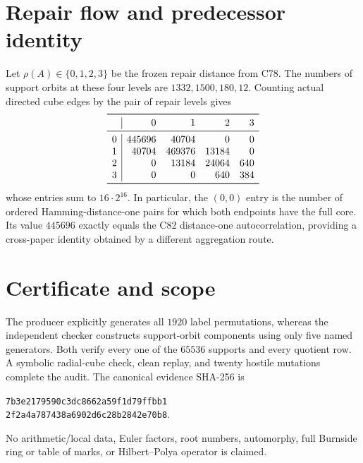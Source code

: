 \documentclass[10pt]{article}
\begin{document}
\section{Repair flow and predecessor identity}
Let $\rho(A)\in\{0,1,2,3\}$ be the frozen repair distance from C78.  The
numbers of support orbits at these four levels are $1332,1500,180,12$.
Counting actual directed cube edges by the pair of repair levels gives
\[
\begin{array}{c|rrrr}
\toprule
&0&1&2&3\\\midrule
0&445696&40704&0&0\\
1&40704&469376&13184&0\\
2&0&13184&24064&640\\
3&0&0&640&384\\
\bottomrule
\end{array}
\]
whose entries sum to $16\cdot2^{16}$.  In particular, the $(0,0)$ entry is
the number of ordered Hamming-distance-one pairs for which both endpoints
have the full core.  Its value $445696$ exactly equals the C82
distance-one autocorrelation, providing a cross-paper identity obtained by
a different aggregation route.

\section{Certificate and scope}
The producer explicitly generates all $1920$ label permutations, whereas
the independent checker constructs support-orbit components using only five
named generators.  Both verify every one of the $65536$ supports and every
quotient row.  A symbolic radial-cube check, clean replay, and twenty hostile
mutations complete the audit.  The canonical evidence SHA-256 is
\begin{center}
\texttt{7b3e2179590c3dc8662a59f1d79ffbb1}\\[-2pt]
\texttt{2f2a4a787438a6902d6c28b2842e70b8}.
\end{center}
No arithmetic/local data, Euler factors, root numbers, automorphy, full
Burnside ring or table of marks, or Hilbert--Polya operator is claimed.
\end{document}
